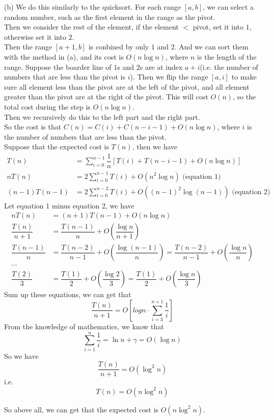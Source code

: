 (b) We do this similarly to the quicksort. For each range $[a,b]$, we can select a random number, such as the first element in the range as the pivot.\\
Then we consider the rest of the element, if the element $<$ pivot, set it into $1$, otherwise set it into $2$.\\
Then the range $[a+1,b]$ is conbined by only $1$ and $2$. And we can sort them with the method in (a), and its cost is $O(n\log n)$, where $n$ is the length of the range. Suppose the boarder line of $1$s and $2$s are at index $a+i$(i.e. the number of numbers that are less than the pivot is $i$). 
Then we flip the range $[a,i]$ to make sure all element less than the pivot are at the left of the pivot, and all element greater than the pivot are at the right of the pivot. This will cost $O(n)$, so the total cost during the step is $O(n\log n)$.\\
Then we recursively do this to the left part and the right part.\\
So the cost is that $C(n)=C(i)+C(n-i-1)+O(n\log n)$, where $i$ is the number of numbers that are less than the pivot.\\
Suppose that the expected cost is $T(n)$, then we have
\begin{align*}
    T(n)  &= \sum_{i=0}^{n-1}\dfrac{1}{n}[T(i)+T(n-i-1)+O(n\log n)] \\
    nT(n) &= 2\sum_{i=0}^{n-1}T(i) + O(n^2\log n)            \text{\ \ \ \ \ \ \ \ \ \ \ \ \ \ \ \ \ (equation 1)} \\
    (n-1)T(n-1) &= 2\sum_{i=0}^{n-2}T(i) + O((n-1)^2\log (n-1))      \text{\ \ \ (equation 2)}
\end{align*}
Let equation 1 minus equation 2, we have
\begin{align*}
    nT(n) &= (n+1)T(n-1) + O(n\log n)\\
    \dfrac{T(n)}{n+1} &= \dfrac{T(n-1)}{n} + O(\dfrac{\log n}{n+1})\\
    \dfrac{T(n-1)}{n} &= \dfrac{T(n-2)}{n-1} + O(\dfrac{\log (n-1)}{n}) = \dfrac{T(n-2)}{n-1} + O(\dfrac{\log n}{n})\\
    \cdots\\
    \dfrac{T(2)}{3} &= \dfrac{T(1)}{2} + O(\dfrac{\log 2}{3}) = \dfrac{T(1)}{2} + O(\dfrac{\log n}{3})
\end{align*}
Sum up these equations, we can get that
$$\dfrac{T(n)}{n+1}=O\left[logn\cdot \sum_{i=3}^{n+1}\dfrac{1}{i}\right]$$
From the knowledge of mathematics, we know that
$$\sum_{i=1}^{n}\dfrac{1}{i}=\ln n + \gamma = O(\log n)$$
So we have 
$$\dfrac{T(n)}{n+1}=O(\log^2n)$$
i.e.
$$T(n)=O(n\log^2n)$$

So above all, we can get that the expected cost is $O(n\log^2n)$.

\newpage